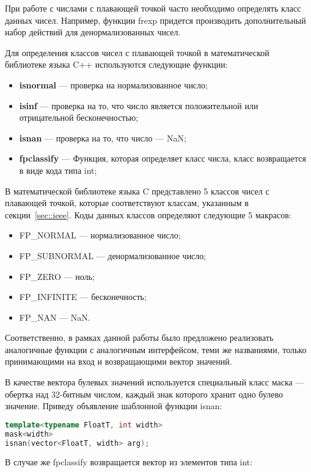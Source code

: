 При работе с числами с плавающей точкой часто необходимо определять класс данных чисел.
Например, функции frexp придется производить дополнительный набор действий для денормализованных чисел.

Для определения классов чисел с плавающей точкой в математической библиотеке языка C++ используются следующие функции:

\begin{itemize}
    \item \textbf{isnormal} --- проверка на нормализованное число;
    \item \textbf{isinf} --- проверка на то, что число является положительной или отрицательной бесконечностью;
    \item \textbf{isnan} --- проверка на то, что число --- NaN;
    \item \textbf{fpclassify} --- Функция, которая определяет класс числа, класс возвращается в виде кода типа int;
\end{itemize}

В математической библиотеке языка C представлено 5 классов чисел с плавающей точкой, которые соответствуют классам, указанным в секции~\ref{sec::ieee}.
Коды данных классов определяют следующие 5 макрасов:

\begin{itemize}
    \item FP\_NORMAL --- нормализованное число;
    \item FP\_SUBNORMAL --- денормализованное число;
    \item FP\_ZERO --- ноль;
    \item FP\_INFINITE --- бесконечность;
    \item FP\_NAN --- NaN.
\end{itemize}

Соответственно, в рамках данной работы было предложено реализовать аналогичные функции с аналогичным интерфейсом, теми же названиями, только принимающими на вход и возвращающими вектор значений.

В качестве вектора булевых значений используется специальный класс маска --- обертка над 32-битным числом, каждый знак которого хранит одно булево значение.
Приведу объявление шаблонной функции isnan:

\begin{lstlisting}[language=C++]
template<typename FloatT, int width>
mask<width>
isnan(vector<FloatT, width> arg);
\end{lstlisting}

В случае же fpclassify возвращается вектор из элементов типа int:

